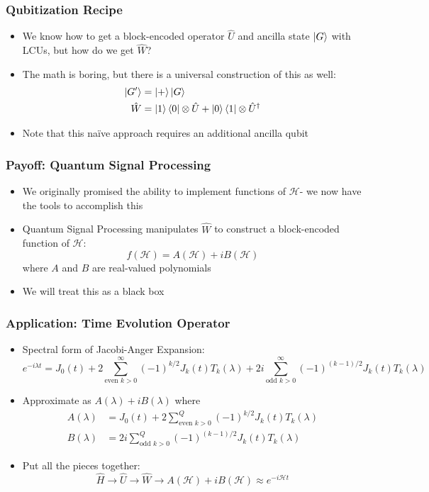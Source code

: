 \documentclass[aspectratio=169]{beamer}
\begin{document}
\begin{frame}
	\frametitle{Qubitization Recipe}
	\begin{itemize}[<+->]
		\item We know how to get a block-encoded operator $\hat{U}$ and ancilla state $\ket{G}$ with LCUs, but how do we get $\hat{W}$?
	\item The math is boring, but there is a universal construction of this as well:
	\begin{align}
		\nonumber \ket{G'} &= \ket{+}\ket{G}\\
		\nonumber \hat{W} &= \ket{1}\bra{0}\otimes\hat{U} + \ket{0}\bra{1}\otimes\hat{U}^{\dagger}
	\end{align}
	\item Note that this na{\"i}ve approach requires an additional ancilla qubit
	\end{itemize}
\end{frame}

\begin{frame}
	\frametitle{Payoff: Quantum Signal Processing }
	\begin{itemize}[<+->]
	\item We originally promised the ability to implement functions of $\mathcal{H}$- we now have the tools to accomplish this
	\item Quantum Signal Processing manipulates $\hat{W}$ to construct a block-encoded function of $\mathcal{H}$:
	\begin{equation}\nonumber
	f(\mathcal{H}) = A(\mathcal{H})+iB(\mathcal{H})
	\end{equation}
	where $A$ and $B$ are real-valued polynomials
	\item We will treat this as a black box
	\end{itemize}
\end{frame}

\begin{frame}
	\frametitle{Application: Time Evolution Operator}
	\begin{itemize}[<+->]
	\item Spectral form of Jacobi-Anger Expansion:
		\begin{equation}\nonumber
			e^{-i\lambda t} = J_0(t) + 2\sum_{\text{even }k >0}^{\infty}(-1)^{k/2}J_k(t)T_k(\lambda) + 2i\sum_{\text{odd }k >0}^{\infty}(-1)^{(k-1)/2}J_k(t)T_k(\lambda)
		\end{equation}
	\item Approximate as $A(\lambda)+iB(\lambda)$ where
	\begin{align}
		\nonumber A(\lambda) &=  J_0(t) + 2\sum_{\text{even }k >0}^{Q}(-1)^{k/2}J_k(t)T_k(\lambda)\\
		\nonumber B(\lambda) &=  2i\sum_{\text{odd }k >0}^{Q}(-1)^{(k-1)/2}J_k(t)T_k(\lambda)
	\end{align}
	\item Put all the pieces together:
		\begin{equation}\nonumber
			\hat{H}\rightarrow\hat{U}\rightarrow\hat{W}\rightarrow A(\mathcal{H})+iB(\mathcal{H})\approx e^{-i\mathcal{H}t}
		\end{equation}
	\end{itemize}
\end{frame}
\end{document}
